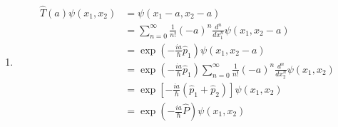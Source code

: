 \documentclass{article}
\begin{document}
\setcounter{subsection}{6}
\subsection{}

\begin{enumerate}
  \item

        \begin{align*}
          \hat{T}(a) \psi(x_1, x_2) & = \psi(x_1 - a, x_2 - a)                                                                                                      \\
                                    & = \sum_{n = 0}^\infty \frac{1}{n!} (-a)^n \frac{d^n}{d x_1^n} \psi(x_1, x_2 - a)                                              \\
                                    & = \exp \left( -\frac{i a}{\hbar} \hat{p}_1 \right) \psi(x_1, x_2 - a)                                                         \\
                                    & = \exp \left( -\frac{i a}{\hbar} \hat{p}_1 \right) \sum_{n = 0}^\infty \frac{1}{n!} (-a)^n \frac{d^n}{d x_2^n} \psi(x_1, x_2) \\
                                    & = \exp \left[ -\frac{i a}{\hbar} (\hat{p}_1 + \hat{p}_2) \right] \psi(x_1, x_2)                                               \\
                                    & = \exp \left( -\frac{i a}{\hbar} \hat{P} \right) \psi(x_1, x_2)
        \end{align*}
\end{enumerate}

\subsection{}
\end{document}
